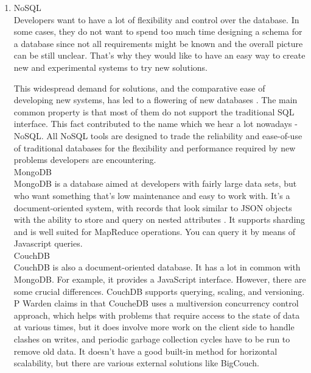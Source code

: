 \documentclass[runningheads]{llncs}
\begin{document}
\begin{enumerate}
\item NoSQL\\

Developers want to have a lot of flexibility and control over the database. In some cases, they do not want to spend too much time designing a schema for a database since not all requirements might be known and the overall picture can be still unclear. That's why they would like to have an easy way to create new and experimental systems to try new solutions.

This widespread demand for solutions, and the comparative ease of developing new systems, has led to a flowering of new databases \cite{GLOSSARY}. The main common property is that most of them do not support the traditional SQL interface. This fact contributed to the name which we hear a lot nowadays - NoSQL. All NoSQL tools are designed to trade the reliability and ease-of-use of traditional databases for the flexibility and performance required by new problems developers are encountering.\\

MongoDB\\

MongoDB is a database aimed at developers with fairly large data sets, but who want something that's low maintenance and easy to work with. It's a document-oriented system, with records that look similar to JSON objects with the ability to store and query on nested attributes \cite{GLOSSARY}. It supports sharding and is well suited for MapReduce operations. You can query it by means of Javascript queries.\\ 

CouchDB\\

CouchDB is also a document-oriented database. It has a lot in common with MongoDB. For example, it provides
a JavaScript interface. However, there are some crucial differences. CouchDB supports querying, scaling, and versioning. P Warden claims in \cite{GLOSSARY} that CoucheDB uses a multiversion concurrency control approach, which helps with problems that require access to the state of data at various times, but it does involve more work on the client side to handle clashes on writes, and periodic garbage collection cycles have to be run to remove old data. It doesn't have a good built-in method for horizontal scalability, but there are various external solutions like BigCouch.\\


\end{enumerate}
\end{document}
